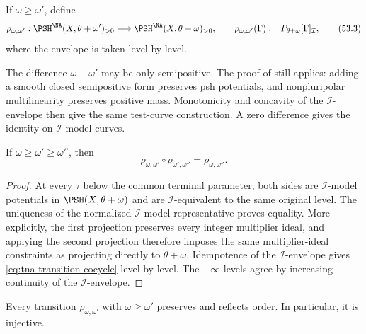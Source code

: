 If $\omega\geq\omega'$, define
\[
 \rho_{\omega,\omega'}:
 \PSH^{\NA}(X,\theta+\omega')_{>0}
 \longrightarrow
 \PSH^{\NA}(X,\theta+\omega)_{>0},
 \qquad
 \rho_{\omega,\omega'}(\Gamma)
 :=P_{\theta+\omega}[\Gamma]_{\mathcal I},
\tag{53.3}\label{eq:tna-transition}
\]
where the envelope is taken level by level.

The difference $\omega-\omega'$ may be only semipositive.
The proof of  still applies:
adding a smooth closed semipositive form preserves psh potentials,
and nonpluripolar multilinearity preserves positive mass.
Monotonicity and concavity of the $\mathcal I$-envelope then give
the same test-curve construction.  A zero difference gives the identity
on $\mathcal I$-model curves.

\begin{lemma}\label{lem:tna-transition-cocycle}
If $\omega\geq\omega'\geq\omega''$, then
\[
 \rho_{\omega,\omega'}\circ\rho_{\omega',\omega''}
 =\rho_{\omega,\omega''}.
\tag{53.4}\label{eq:tna-transition-cocycle}
\]
\end{lemma}

\begin{proof}
At every $\tau$ below the common terminal parameter, both sides are
$\mathcal I$-model potentials in $\PSH(X,\theta+\omega)$ and are
$\mathcal I$-equivalent to the same original level.  The uniqueness of
the normalized $\mathcal I$-model representative proves equality.
More explicitly, the first projection preserves every integer multiplier
ideal, and applying the second projection therefore imposes the same
multiplier-ideal constraints as projecting directly to
$\theta+\omega$.  Idempotence of the $\mathcal I$-envelope gives
\eqref{eq:tna-transition-cocycle} level by level.
The $-\infty$ levels agree by increasing continuity of the
$\mathcal I$-envelope.
\end{proof}

\begin{lemma}\label{lem:tna-transition-order}
Every transition $\rho_{\omega,\omega'}$ with $\omega\geq\omega'$
preserves and reflects order. In particular, it is injective.
\end{lemma}

